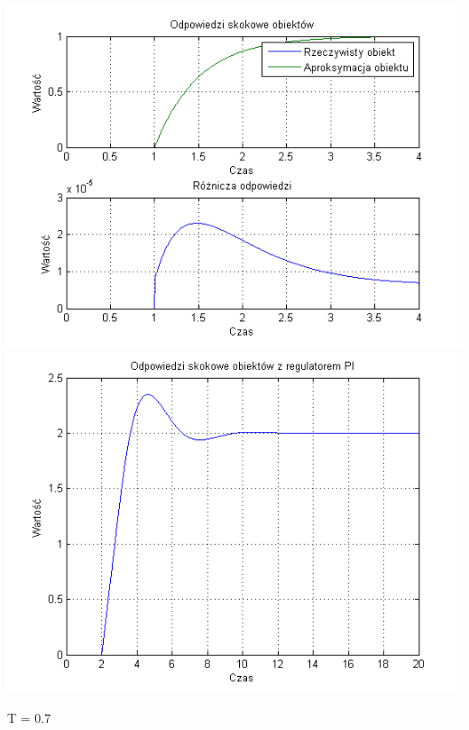 \documentclass[10pt,a4paper]{article}
\begin{document}
\begin{center}
\includegraphics[scale=1]{images/jeden/skrypt_11.png}\\
\includegraphics[scale=1]{images/jeden/skrypt_12.png}\\
\end{center}
\newpage
T = 0.7
\end{document}
